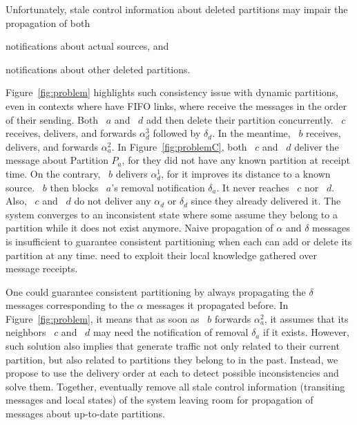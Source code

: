 Unfortunately, stale control information about deleted partitions may
impair the propagation of both
\begin{inparaenum}[(i)]
\item notifications about actual sources, and
\item notifications about other deleted partitions.
\end{inparaenum}
Figure~\ref{fig:problem} highlights such consistency issue with
dynamic partitions, even in contexts where \processes have FIFO links,
\ie where \processes receive the messages in the order of their
sending. Both \Process~$a$ and \Process~$d$ add then delete their
partition concurrently. \Process~$c$ receives, delivers, and forwards
$\alpha_d^3$ followed by $\delta_d$. In the meantime, \Process~$b$
receives, delivers, and forwards $\alpha_a^2$. In
Figure~\ref{fig:problemC}, both \Process~$c$ and \Process~$d$ deliver
the message about Partition $P_a$, for they did not have any known
partition at receipt time. On the contrary, \Process~$b$ delivers
$\alpha_d^1$, for it improves its distance to a known
source. \Process~$b$ then blocks \Process~$a$'s removal notification
$\delta_a$. It never reaches \Process~$c$ nor \Process~$d$. Also,
\Process~$c$ and \Process~$d$ do not deliver any $\alpha_d$ or
$\delta_d$ since they already delivered it. The system converges to an
inconsistent state where some \processes assume they belong to a
partition while it does not exist anymore. Naive propagation of
$\alpha$ and $\delta$ messages is insufficient to guarantee consistent
partitioning when each \process can add or delete its partition at any
time. \Processes need to exploit their local knowledge gathered over
message receipts.



One could guarantee consistent partitioning by always propagating the
$\delta$ messages corresponding to the $\alpha$ messages it propagated
before. In Figure~\ref{fig:problem}, it means that as soon as
\Process~$b$ forwards $\alpha_a^2$, it assumes that its neighbors
\Process~$c$ and \Process~$d$ may need the notification of removal
$\delta_a$ if it exists. However, such solution also implies that
\processes generate traffic not only related to their current
partition, but also related to partitions they belong to in the
past. Instead, we propose to use the delivery order at each \process
to detect possible inconsistencies and solve them. Together,
\processes eventually remove all stale control information (transiting
messages and local states) of the system leaving room for propagation
of messages about up-to-date partitions.

